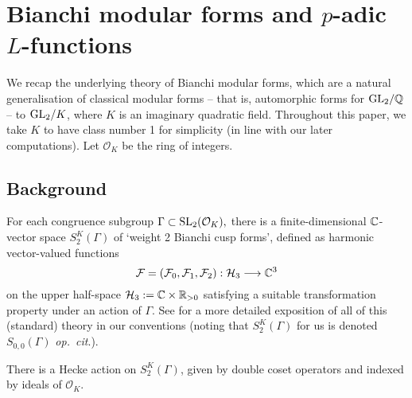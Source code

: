 \documentclass[a4paper,11pt]{article}
\numberwithin{equation}{section}
\begin{document}
\section{Bianchi modular forms and \texorpdfstring{$p$}{p}-adic \texorpdfstring{$L$}{L}-functions}
\label{sec:bianchi p-adic l-functions}
We recap the underlying theory of Bianchi modular forms, which are a natural generalisation of classical modular forms -- that is, automorphic forms for $\mathrm{GL}_2/\mathbb{Q}$ -- to $\mathrm{GL}_2/K$, where $K$ is an imaginary quadratic field. Throughout this paper, we take $K$ to have class number 1 for simplicity (in line with our later computations). Let $\mathcal{O}_K$ be the ring of integers.

\subsection{Background}
For each congruence subgroup $\Gamma \subset \mathrm{SL}_2(\mathcal{O}_K),$ there is a finite-dimensional $\mathbb{C}$-vector space $S_{2}^K(\Gamma)$ of `weight 2 Bianchi cusp forms', defined as harmonic vector-valued functions
\[
    \mathcal{F} = (\mathcal{F}_0,\mathcal{F}_1,\mathcal{F}_2) : \mathcal{H}_3 \longrightarrow \mathbb{C}^3
\]
 on the upper half-space $\mathcal{H}_3 := \mathbb{C}\times\mathbb{R}_{>0}$ satisfying a suitable transformation property under an action of $\Gamma.$ See \cite[\S1]{Wil17} for a more detailed exposition of all of this (standard) theory in our conventions (noting that $S_2^K(\Gamma)$ for us is denoted $S_{0,0}(\Gamma)$ \emph{op.\ cit}.).

 There is a Hecke action on $S_2^K(\Gamma)$, given by double coset operators and indexed by ideals of $\mathcal{O}_K$.
\end{document}
